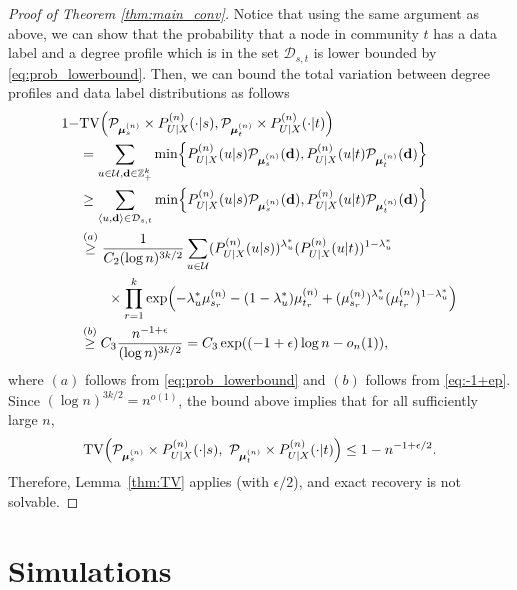 \documentclass[11pt]{article}
\theoremstyle{plain}
\theoremstyle{definition}
\begin{document}
\begin{proof}[Proof of Theorem \ref{thm:main_conv}]
Notice that using the same argument as above, we can show that 
the probability that a node in community $t$ has a data label and
a degree profile which is in the set $\mathcal{D}_{s,t}$ is lower bounded
by \eqref{eq:prob_lowerbound}.
Then, we can bound the total variation between degree profiles and data label distributions as follows
\begin{align*}
1- & \mathrm{TV}\Bigl(\mathcal{P}_{\boldsymbol{\mu}_s^{(n)}} \times P^{(n)}_{U|X}(\cdot|s)  , \mathcal{P}_{\boldsymbol{\mu}_t^{(n)}}\times P^{(n)}_{U|X}(\cdot |t) \Bigr) \\
& = \sum_{u\in\mathcal{U}, \mathbf{d} \in \mathbb{Z}_+^k} 
\min\Bigl\{
P^{(n)}_{U|X}(u|s) \mathcal{P}_{\boldsymbol{\mu}_s^{(n)}} (\mathbf{d}),
P^{(n)}_{U|X}(u|t) \mathcal{P}_{\boldsymbol{\mu}_t^{(n)}} (\mathbf{d})
\Bigr\} \\
& \ge \sum_{\langle u, \mathbf{d} \rangle \in \mathcal{D}_{s,t}} 
\min\Bigl\{
P^{(n)}_{U|X}(u|s) \mathcal{P}_{\boldsymbol{\mu}_s^{(n)}} (\mathbf{d}),
P^{(n)}_{U|X}(u|t) \mathcal{P}_{\boldsymbol{\mu}_t^{(n)}} (\mathbf{d})
\Bigr\} \\
& \overset{(a)}{\ge} \frac{1}{C_2 (\log n)^{3 k/2}}
\sum_{u \in \mathcal{U}}
(P^{(n)}_{U|X}(u|s))^{\lambda_u^*} (P^{(n)}_{U|X}(u|t))^{1-\lambda_u^*} \nonumber \\
&\quad\quad \times \prod_{r=1}^k
\exp\Bigl(-\lambda_u^* \mu_{s_r}^{(n)} -  (1-\lambda_u^*) \mu_{t_r}^{(n)} + (\mu_{s_r}^{(n)})^{\lambda_u^*} (\mu_{t_r}^{(n)}) ^{1-\lambda_u^*} \Bigr)
\\ & \overset{(b)}{\ge}
C_3 \frac{n^{-1+\epsilon}}{(\log n)^{3k/2}} = C_3 \exp( (-1+\epsilon) \log n - o_n(1)),
\end{align*}
where $(a)$ follows from \eqref{eq:prob_lowerbound} and $(b)$ follows from \eqref{eq:-1+ep}.
Since $(\log n)^{3k/2}=n^{o(1)}$, the bound above implies that for all sufficiently large $n$,
\[
\mathrm{TV}\Bigl(\mathcal{P}_{\boldsymbol{\mu}_s^{(n)}} \times P^{(n)}_{U|X}(\cdot|s),\ \mathcal{P}_{\boldsymbol{\mu}_t^{(n)}} \times P^{(n)}_{U|X}(\cdot|t)\Bigr)
\le 1 - n^{-1+\epsilon/2}.
\]
Therefore, Lemma~\ref{thm:TV} applies (with $\epsilon/2$), and exact recovery is not solvable.

\end{proof}

\section{Simulations}\label{sec:simulation}
\end{document}
